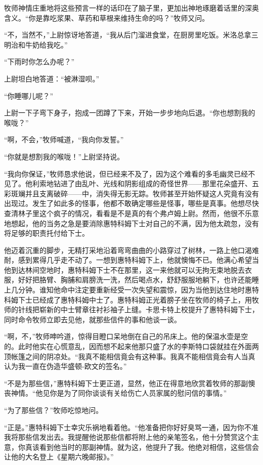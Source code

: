     牧师神情庄重地将这些预言一样的话印在了脑子里，更加出神地琢磨着话里的深奥含义。“你是靠吃浆果、草药和草根来维持生命的吗？”牧师又问。

    “不，当然不，”上尉惊讶地答道，“我从后门溜进食堂，在厨房里吃饭。米洛总拿三明治和牛奶给我吃。”

    “下雨时你怎么办呢？”

    上尉坦白地答道：“被淋湿呗。”

    “你睡哪儿呢？”

    上尉一下子弯下身子，抱成一团蹲了下来，开始一步步地向后退。“你也想割我的喉咙？”

    “啊，不会，”牧师喊道，“我向你发誓。”

    “你就是想割我的喉咙！”上尉坚持说。

    “我向你保证，”牧师恳求他说，但已经来不及了，因为这个难看的多毛幽灵已经不见了。他利索地钻进了由乱叶、光线和阴影组成的奇怪世界——那里花朵盛开、五彩斑斓并且支离破碎——中，消失得无影无踪。牧师甚至开始怀疑这人究竟有没有出现过。发生了如此多的怪事，他都不敢确定哪些是怪事，哪些是真事。他想尽快查清林子里这个疯子的情况，看看是不是真的有个弗卢姆上尉。然而，他很不乐意地想起，他的当务之急是要消除惠特科姆下士对自己的不满，因为他太疏忽，没有将足够的职责托付给下士。

    他迈着沉重的脚步，无精打采地沿着弯弯曲曲的小路穿过了树林，一路上他口渴难耐，感到累得几乎走不动了。一想到惠特科姆下上，他就懊悔不已。他满心希望当他到达林间空地时，惠特科姆下士不在那里，这一来他就可以无拘无束地脱去衣服，好好把胳臂、胸脯和肩膀洗一洗，然后喝点水，舒舒服服地躺下，也许还能睡上几分钟。谁知他命中注定要重新经受一次失望和震惊，因为当他到达住地时惠特科姆下士已经成了惠特科姆中士了。惠特科姆正光着膀子坐在牧师的椅子上，用牧师的针线把崭新的中士臂章往衬衫袖子上缝。卡思卡特上校提升了惠特科姆下士，同时命令牧师立即去见他，就那些信件的事和他谈一谈。

    “啊，不，”牧师呻吟道，惊得目瞪口呆地倒在自己的吊床上。他的保温水壶是空的。此时他实在心慌意乱，因而想不起来他那只盛了水的李斯特口袋就挂在外面两顶帐篷之间的阴凉处。“我真不能相信竟会有这种事。我真不能相信竟会有人当真认为我一直在伪造华盛顿-欧文的签名。”

    “不是为那些信，”惠特科姆下士更正道，显然，他正在得意地欣赏着牧师的那副懊丧神情。“他见你是为了同你谈谈有关给伤亡人员家属的慰问信的事情。”

    “为了那些信？”牧师吃惊地问。

    “正是。”惠特科姆下士幸灾乐祸地看着他。“他准备把你好好臭骂一通，因为你不准我将那些信发出去。我提醒他说那些信都将附上他的亲笔签名，他十分赞赏这个主意，你真该看到他当时的那副神情。就为这，他提升了我。他绝对相信，这些信会让他的大名登上《星期六晚邮报》。”

